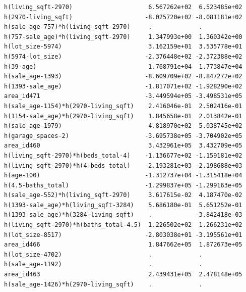 \documentclass[
]{article}
\begin{document}
\begin{verbatim}
h(living_sqft-2970)                     6.567262e+02  6.523485e+02
h(2970-living_sqft)                    -8.025720e+02 -8.081181e+02
h(sale_age-757)*h(living_sqft-2970)     .             .           
h(757-sale_age)*h(living_sqft-2970)     1.347993e+00  1.360342e+00
h(lot_size-5974)                        3.162159e+01  3.535778e+01
h(5974-lot_size)                       -2.376448e+02 -2.372388e+02
h(39-age)                               1.768791e+04  1.773847e+04
h(sale_age-1393)                       -8.609709e+02 -8.847272e+02
h(1393-sale_age)                       -1.817071e+02 -1.928290e+02
area_id471                             -3.449594e+05 -3.498531e+05
h(sale_age-1154)*h(2970-living_sqft)    2.416046e-01  2.502416e-01
h(1154-sale_age)*h(2970-living_sqft)    1.845658e-01  2.013842e-01
h(sale_age-1979)                        4.818970e+02  5.038745e+02
h(garage_spaces-2)                     -3.695738e+05 -3.704902e+05
area_id460                              3.432961e+05  3.432709e+05
h(living_sqft-2970)*h(beds_total-4)    -1.136677e+02 -1.159181e+02
h(living_sqft-2970)*h(4-beds_total)    -2.193281e+03 -2.198688e+03
h(age-100)                             -1.312737e+04 -1.315418e+04
h(4.5-baths_total)                     -1.299837e+05 -1.299163e+05
h(sale_age-552)*h(living_sqft-2970)     3.617615e-02  4.187470e-02
h(1393-sale_age)*h(living_sqft-3284)    5.686180e-01  5.651252e-01
h(1393-sale_age)*h(3284-living_sqft)    .            -3.842418e-03
h(living_sqft-2970)*h(baths_total-4.5)  1.226502e+02  1.266231e+02
h(lot_size-8517)                       -2.803038e+01 -3.195561e+01
area_id466                              1.847662e+05  1.872673e+05
h(lot_size-4702)                        .             .           
h(sale_age-1192)                        .             .           
area_id463                              2.439431e+05  2.478148e+05
h(sale_age-1426)*h(2970-living_sqft)    .             .           
                                                                  

\end{verbatim}
\end{document}
